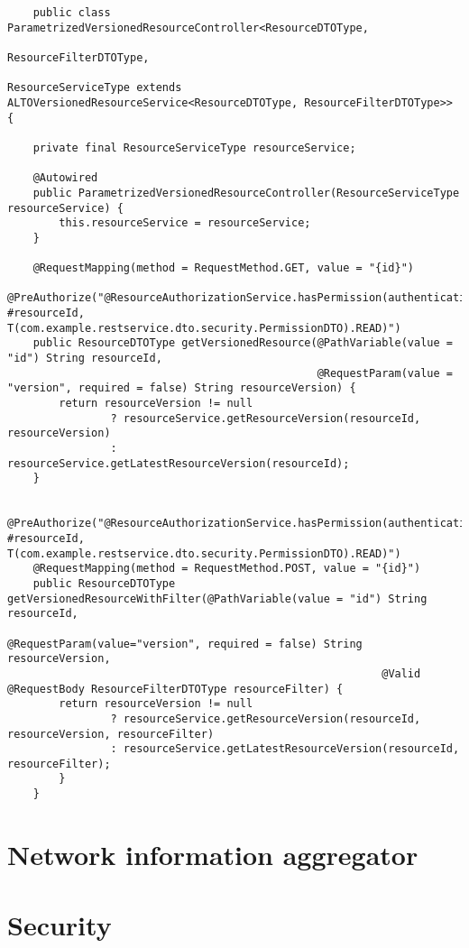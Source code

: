     \begin{lstlisting}
    public class ParametrizedVersionedResourceController<ResourceDTOType,
                                                     ResourceFilterDTOType,
                                                     ResourceServiceType extends ALTOVersionedResourceService<ResourceDTOType, ResourceFilterDTOType>> {

    private final ResourceServiceType resourceService;

    @Autowired
    public ParametrizedVersionedResourceController(ResourceServiceType resourceService) {
        this.resourceService = resourceService;
    }

    @RequestMapping(method = RequestMethod.GET, value = "{id}")
    @PreAuthorize("@ResourceAuthorizationService.hasPermission(authentication, #resourceId, T(com.example.restservice.dto.security.PermissionDTO).READ)")
    public ResourceDTOType getVersionedResource(@PathVariable(value = "id") String resourceId,
                                                @RequestParam(value = "version", required = false) String resourceVersion) {
        return resourceVersion != null
                ? resourceService.getResourceVersion(resourceId, resourceVersion)
                : resourceService.getLatestResourceVersion(resourceId);
    }

    @PreAuthorize("@ResourceAuthorizationService.hasPermission(authentication, #resourceId, T(com.example.restservice.dto.security.PermissionDTO).READ)")
    @RequestMapping(method = RequestMethod.POST, value = "{id}")
    public ResourceDTOType getVersionedResourceWithFilter(@PathVariable(value = "id") String resourceId,
                                                          @RequestParam(value="version", required = false) String resourceVersion,
                                                          @Valid @RequestBody ResourceFilterDTOType resourceFilter) {
        return resourceVersion != null
                ? resourceService.getResourceVersion(resourceId, resourceVersion, resourceFilter)
                : resourceService.getLatestResourceVersion(resourceId, resourceFilter);
        }
    }

    \end{lstlisting}



\section{Network information aggregator}

\section{Security}

